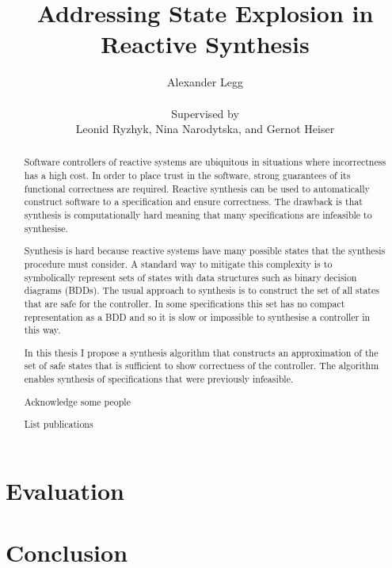 \documentclass[a4paper, twoside, openright, 11pt, oldfontcommands]{memoir}
\title{Addressing State Explosion in Reactive Synthesis}
\author{Alexander Legg \\
    \\
    Supervised by \\
Leonid Ryzhyk, Nina Narodytska, and Gernot Heiser}
\begin{document}
\maketitle

\setcounter{secnumdepth}{3}
\setcounter{tocdepth}{3}
\tableofcontents

\newpage

\begin{abstract}

Software controllers of reactive systems are ubiquitous in situations where incorrectness has a high cost. In order to place trust in the software, strong guarantees of its functional correctness are required. Reactive synthesis can be used to automatically construct software to a specification and ensure correctness. The drawback is that synthesis is computationally hard meaning that many specifications are infeasible to synthesise.

Synthesis is hard because reactive systems have many possible states that the synthesis procedure must consider. A standard way to mitigate this complexity is to symbolically represent sets of states with data structures such as binary decision diagrams (BDDs). The usual approach to synthesis is to construct the set of all states that are safe for the controller. In some specifications this set has no compact representation as a BDD and so it is slow or impossible to synthesise a controller in this way.

In this thesis I propose a synthesis algorithm that constructs an approximation of the set of safe states that is sufficient to show correctness of the controller. The algorithm enables synthesis of specifications that were previously infeasible.

\end{abstract}

\newpage

\renewcommand{\abstractname}{Acknowledgements}
\begin{abstract}
Acknowledge some people
\end{abstract}

\newpage

\renewcommand{\abstractname}{Publications}
\begin{abstract}
List publications
\end{abstract}













\chapter{Evaluation}

\chapter{Conclusion}



\end{document}
